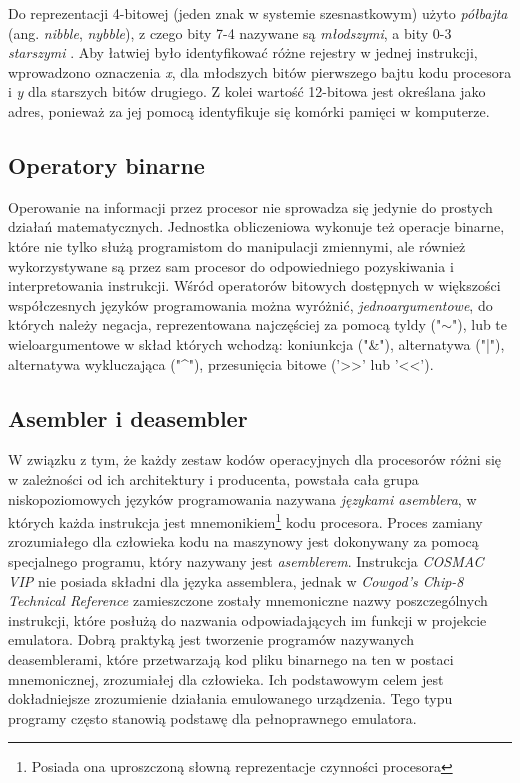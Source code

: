 Do reprezentacji 4-bitowej (jeden znak w systemie szesnastkowym) użyto \textit{półbajta} (ang. \textit{nibble}, \textit{nybble}), z czego bity 7-4 nazywane są \textit{młodszymi}, a bity 0-3 \textit{starszymi} \cite{Cowgod}. Aby łatwiej było identyfikować różne rejestry w jednej instrukcji, wprowadzono oznaczenia \textit{x}, dla młodszych bitów pierwszego bajtu kodu procesora i \textit{y} dla starszych bitów drugiego. Z kolei wartość 12-bitowa jest określana jako adres, ponieważ za jej pomocą identyfikuje się komórki pamięci w komputerze. \\

\subsection{Operatory binarne}
Operowanie na informacji przez procesor nie sprowadza się jedynie do prostych działań matematycznych. Jednostka obliczeniowa wykonuje też operacje binarne, które nie tylko służą programistom do manipulacji zmiennymi, ale również wykorzystywane są przez sam procesor do odpowiedniego pozyskiwania i interpretowania instrukcji. Wśród operatorów bitowych dostępnych w większości współczesnych języków programowania można wyróżnić, \textit{jednoargumentowe}, do których należy negacja, reprezentowana najczęściej za pomocą tyldy ("$\sim$"), lub te wieloargumentowe w skład których wchodzą: koniunkcja ("\&"), alternatywa ("|"), alternatywa wykluczająca ("\string^"), przesunięcia bitowe ('>>' lub '<<'). \\

\subsection{Asembler i deasembler}
W związku z tym, że każdy zestaw kodów operacyjnych dla procesorów różni się w zależności od ich architektury i producenta, powstała cała grupa niskopoziomowych języków programowania nazywana \textit{językami asemblera}, w których każda instrukcja jest mnemonikiem\footnote{Posiada ona uproszczoną słowną reprezentacje czynności procesora} kodu procesora. Proces zamiany zrozumiałego dla człowieka kodu na maszynowy jest dokonywany za pomocą specjalnego programu, który nazywany jest \textit{asemblerem}. Instrukcja \textit{COSMAC VIP} \cite{SCHWARZ} nie posiada składni dla języka assemblera, jednak w \textit{Cowgod's Chip-8 Technical Reference} zamieszczone zostały mnemoniczne nazwy poszczególnych instrukcji, które posłużą do nazwania odpowiadających im funkcji w projekcie emulatora. Dobrą praktyką jest tworzenie programów nazywanych deasemblerami, które przetwarzają kod pliku binarnego na ten w postaci mnemonicznej, zrozumiałej dla człowieka. Ich podstawowym celem jest dokładniejsze zrozumienie działania emulowanego urządzenia. Tego typu programy często stanowią podstawę dla pełnoprawnego emulatora. \\


